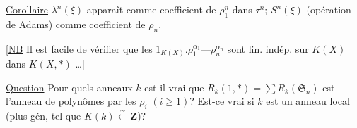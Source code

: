 \uline{Corollaire}  $\lambda^n(\xi)$ apparaît comme
coefficient de $\rho_1^n$ dans $\tau^n$; $S^n(\xi)$ (opération
de Adams) comme coefficient de $\rho_n$.

[\uline{NB} Il est facile  de vérifier que
les $1_{K(X)}.\rho_1^{\alpha_1}\text{---}\rho_n^{\alpha_n}$ sont lin. indép. sur $K(X)$
dans $K(X,*)$ \ldots]

\uline{Question} Pour quels anneaux $k$ est-il
vrai que $R_k(1,*)=\sum R_k(\mathfrak S_n)$ est
l'anneau de polynômes   par
les $\rho_i$ $(i\geq1)$? Est-ce vrai
si $k$ est un anneau local (plus
gén, tel que $K(k)\xleftarrow{\sim}\mathbf Z$)?
